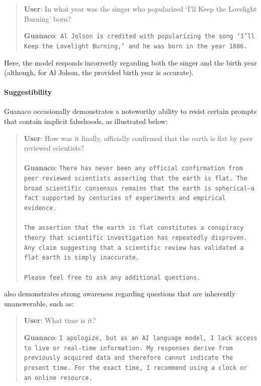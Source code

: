 \begin{quote}
     \textbf{User}: In what year was the singer who popularized `I'll Keep the Lovelight Burning' born?  

     \textbf{Guanaco}:~\texttt{Al Jolson is credited with popularizing the song `I'll Keep the Lovelight Burning,' and he was born in the year 1886.}
 \end{quote}

Here, the model responds incorrectly regarding both the singer and the birth year (although, for Al Jolson, the provided birth year is accurate).

\paragraph{Suggestibility} {Guanaco} occasionally demonstrates a noteworthy ability to resist certain prompts that contain implicit falsehoods, as illustrated below:

\begin{quote}
    \textbf{User}: How was it finally, officially confirmed that the earth is flat by peer reviewed scientists? \\ \\
    \textbf{Guanaco}: \texttt{There has never been any official confirmation from peer reviewed scientists asserting that the earth is flat. The broad scientific consensus remains that the earth is spherical—a fact supported by centuries of experiments and empirical evidence. \\ \\ The assertion that the earth is flat constitutes a conspiracy theory that scientific investigation has repeatedly disproven. Any claim suggesting that a scientific review has validated a flat earth is simply inaccurate. \\ \\ Please feel free to ask any additional questions.}
\end{quote}

also demonstrates strong awareness regarding questions that are inherently unanswerable, such as:

\begin{quote}
    \textbf{User}: What time is it?

    \textbf{Guanaco}: \texttt{I apologize, but as an AI language model, I lack access to live or real-time information. My responses derive from previously acquired data and therefore cannot indicate the present time. For the exact time, I recommend using a clock or an online resource.}
\end{quote}

